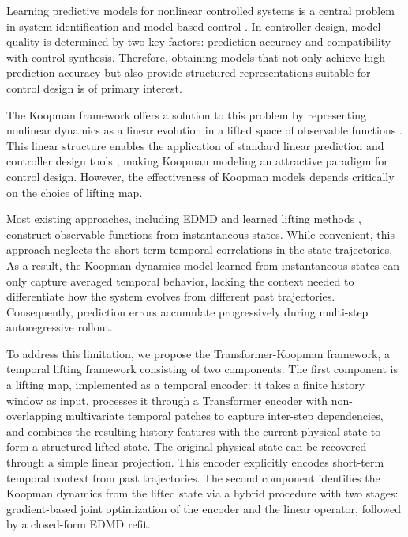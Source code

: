 \documentclass[journal]{IEEEtran}
\begin{document}
Learning predictive models for nonlinear controlled systems is a central problem in system identification and model-based control \cite{ljung1999system, vanoverschee1994n4sid, nelles2020nonlinear}. In controller design, model quality is determined by two key factors: prediction accuracy and compatibility with control synthesis. Therefore, obtaining models that not only achieve high prediction accuracy but also provide structured representations suitable for control design is of primary interest.

The Koopman framework offers a solution to this problem by representing nonlinear dynamics as a linear evolution in a lifted space of observable functions \cite{koopman1931hamiltonian, brunton2022modern}. This linear structure enables the application of standard linear prediction and controller design tools \cite{otto2021koopman, korda2018linear}, making Koopman modeling an attractive paradigm for control design. However, the effectiveness of Koopman models depends critically on the choice of lifting map.

Most existing approaches, including EDMD \cite{williams2015data} and learned lifting methods \cite{lusch2018deep, takeishi2017koopman}, construct observable functions from instantaneous states. While convenient, this approach neglects the short-term temporal correlations in the state trajectories. As a result, the Koopman dynamics model learned from instantaneous states can only capture averaged temporal behavior, lacking the context needed to differentiate how the system evolves from different past trajectories. Consequently, prediction errors accumulate progressively during multi-step autoregressive rollout.

To address this limitation, we propose the Transformer-Koopman framework, a temporal lifting framework consisting of two components. The first component is a lifting map, implemented as a temporal encoder: it takes a finite history window as input, processes it through a Transformer encoder with non-overlapping multivariate temporal patches to capture inter-step dependencies, and combines the resulting history features with the current physical state to form a structured lifted state. The original physical state can be recovered through a simple linear projection. This encoder explicitly encodes short-term temporal context from past trajectories. The second component identifies the Koopman dynamics from the lifted state via a hybrid procedure with two stages: gradient-based joint optimization of the encoder and the linear operator, followed by a closed-form EDMD refit.
\end{document}
